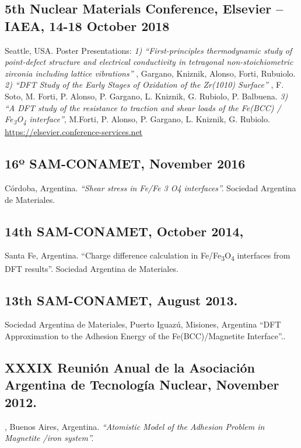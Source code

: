 \subsection{ 5th Nuclear Materials Conference, Elsevier – IAEA, 14-18 October
2018} Seattle, USA. Poster Presentations: \emph{ 1) “First-principles
thermodynamic study of point-defect structure and electrical conductivity in
tetragonal non-stoichiometric zirconia including lattice vibrations”} , Gargano,
Kniznik, Alonso, Forti, Rubuiolo. \emph{ 2) “DFT Study of the Early Stages of
Oxidation of the Zr(1010) Surface”} , F. Soto, M. Forti, P. Alonso, P. Gargano,
L. Kniznik, G. Rubiolo, P. Balbuena. \emph{ 3) “A DFT study of the resistance to
traction and shear loads of the Fe(BCC) / Fe\textsubscript{3}O\textsubscript{4}
interface”}, M.Forti, P. Alonso, P. Gargano, L. Kniznik, G. Rubiolo.
\href{https://elsevier.conference-services.net/programme.asp?conferenceID=4229&action=prog_list&session=45340}{https://elsevier.conference-services.net}

\subsection{16º SAM-CONAMET, November 2016} Córdoba, Argentina. \emph{“Shear
stress in Fe/Fe 3 O4 interfaces”. }Sociedad Argentina de Materiales.

\subsection{14th SAM-CONAMET, October 2014,} Santa Fe, Argentina. “Charge
difference calculation in Fe/Fe\textsubscript{3}O\textsubscript{4} interfaces
from DFT results”. Sociedad Argentina de Materiales.


\subsection{13th SAM-CONAMET, August 2013.} Sociedad Argentina de Materiales,
Puerto Iguazú, Misiones, Argentina “DFT Approximation to the Adhesion Energy of
the Fe(BCC)/Magnetite Interface”..

\subsection{XXXIX Reunión Anual de la Asociación Argentina de Tecnología
Nuclear, November 2012.}, Buenos Aires, Argentina.  \emph{ “Atomistic Model of
the Adhesion Problem in Magnetite /iron system”. }

